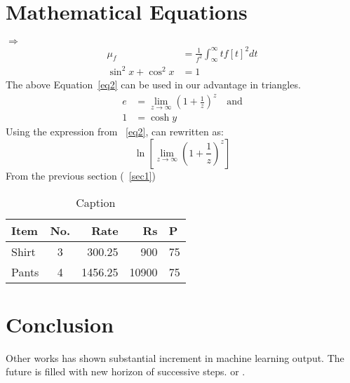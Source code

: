 \documentclass[10pt,twocolumn, a4paper]{article}
\begin{document}
\section{Mathematical Equations}\label{sec2}
$\Rightarrow$
\begin{equation}\label{eq2}
    \begin{aligned}
      \mu_{f} &=\frac{1}{f^2}\int_\infty^\infty t f[t]^2dt\\
      \sin^{2}x+\cos^{2}x &=1
    \end{aligned}
\end{equation}
The above Equation~\eqref{eq2} can be used in our advantage in triangles. 
\begin{align}
    e&=\lim_{z\to \infty} \left(1+\frac{1}{z} \right)^z \quad\mbox{and}\label{eq5}\\1&=\cosh{y}
\end{align}
Using the expression from~
\eqref{eq2}, can rewritten as:
\begin{equation}\label{4}
    \ln\left[\lim_{z\to\infty}\left(1+\frac{1}{z}\right)^z\right]
\end{equation}
From the previous section (~\ref{sec1})
\\
\begin{table}[!h]
\centering
\begin{tabular}{lcrr@{.}l}
\hline
Item & No. & Rate & Rs & P\\
\hline
Shirt & 3 & 300.25 & 900 & 75 \\
Pants & 4 & 1456.25 & 10900 & 75 \\
\hline
\end{tabular}
    \caption{Caption}
    \label{tab:my_label}
\end{table}
\section{Conclusion}\label{concl}
Other works has shown substantial increment in machine learning output. The future is filled with new horizon of successive steps.\citep*{Graham1995} or \citep*{Thomas2008}.
\newpage


\end{document}
